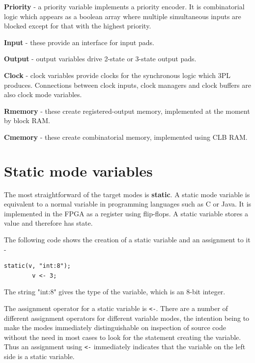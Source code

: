 \documentclass[10pt,a4paper,twoside,fleqn]{article}
\newcommand{\kwd}[1]{{\bf #1}} %
\begin{document}
    \kwd{Priority} - a priority variable implements a priority encoder. It is combinatorial
    logic which appears as a boolean array where multiple simultaneous inputs are blocked
    except for that with the highest priority.

    \kwd{Input} - these provide an interface for input pads.
    
    \kwd{Output} - output variables drive 2-state or 3-state output pads.
    
    \kwd{Clock} - clock variables provide clocks for the synchronous logic which 3PL produces.
    Connections between clock inputs, clock managers and clock buffers are also clock mode
    variables.
    
    \kwd{Rmemory} - these create registered-output memory, implemented at the moment by
    block RAM.
    
    \kwd{Cmemory} - these create combinatorial memory, implemented using CLB RAM.




\section{Static mode variables}

    The most straightforward of the target modes is \kwd{static}. A static mode variable
    is equivalent to a normal variable in programming languages such as C or
    Java. It is implemented in the FPGA as a register using flip-flops. A static
    variable stores a value and therefore has state.
    
    The following code shows the creation of a static variable and an assignment
    to it -
    \begin{lstlisting}[language=threepl]
        static(v, "int:8");
        v <- 3;
    \end{lstlisting}
    The string "int:8" gives the type of the variable, which is an 8-bit integer.
    
    The assignment operator for a static variable is \verb'<-'. There are a number
    of different assignment operators for different variable modes, the intention
    being to make the modes immediately distinguishable on inspection of source
    code without the need in most cases to look for the statement creating
    the variable. Thus an assignment using \verb'<-' immediately indicates that
    the variable on the left side is a static variable.
    
\end{document}

